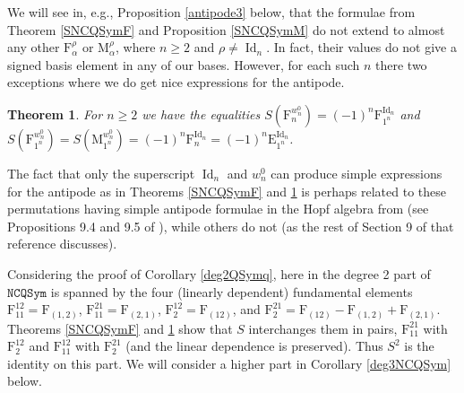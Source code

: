 \documentclass{article}
\newtheorem{thm}{Theorem}[section]
\theoremstyle{definition}
\begin{document}
We will see in, e.g., Proposition \ref{antipode3} below, that the formulae from Theorem \ref{SNCQSymF} and Proposition \ref{SNCQSymM} do not extend to almost any other $\mathrm{F}_{\alpha}^{\rho}$ or $\mathrm{M}_{\alpha}^{\rho}$, where $n\geq2$ and $\rho\neq\operatorname{Id}_{n}$. In fact, their values do not give a signed basis element in any of our bases. However, for each such $n$ there two exceptions where we do get nice expressions for the antipode.
\begin{thm}
For $n\geq2$ we have the equalities $S(\mathrm{F}_{n}^{w^{0}_{n}})=(-1)^{n}\mathrm{F}_{1^{n}}^{\operatorname{Id}_{n}}$ and $S(\mathrm{F}_{1^{n}}^{w^{0}_{n}})=S(\mathrm{M}_{1^{n}}^{w^{0}_{n}})=(-1)^{n}\mathrm{F}_{n}^{\operatorname{Id}_{n}}=(-1)^{n}\mathrm{E}_{1^{n}}^{\operatorname{Id}_{n}}$.
\label{SFalphaw0}
\end{thm}
The fact that only the superscript $\operatorname{Id}_{n}$ and $w^{0}_{n}$ can produce simple expressions for the antipode as in Theorems \ref{SNCQSymF} and \ref{SFalphaw0} is perhaps related to these permutations having simple antipode formulae in the Hopf algebra from \cite{[MR]} (see Propositions 9.4 and 9.5 of \cite{[BS]}), while others do not (as the rest of Section 9 of that reference discusses).

Considering the proof of Corollary \ref{deg2QSymq}, here in the degree 2 part of $\mathtt{NCQSym}$ is spanned by the four (linearly dependent) fundamental elements $\mathrm{F}_{11}^{12}=\mathrm{F}_{(1,2)}$, $\mathrm{F}_{11}^{21}=\mathrm{F}_{(2,1)}$,  $\mathrm{F}_{2}^{12}=\mathrm{F}_{(12)}$, and $\mathrm{F}_{2}^{21}=\mathrm{F}_{(12)}-\mathrm{F}_{(1,2)}+\mathrm{F}_{(2,1)}$. Theorems \ref{SNCQSymF} and \ref{SFalphaw0} show that $S$ interchanges them in pairs, $\mathrm{F}_{11}^{21}$ with $\mathrm{F}_{2}^{12}$ and $\mathrm{F}_{11}^{12}$ with $\mathrm{F}_{2}^{21}$ (and the linear dependence is preserved). Thus $S^{2}$ is the identity on this part. We will consider a higher part in Corollary \ref{deg3NCQSym} below.

\medskip
\end{document}
